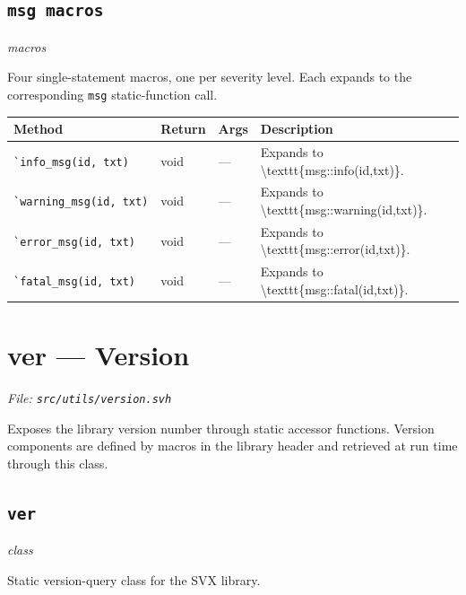 \documentclass[11pt,letterpaper]{report}
\begin{document}
\subsection*{\texttt{msg macros}}
\noindent\small\textit{macros}\par

Four single-statement macros, one per severity level. Each expands to the corresponding \texttt{msg} static-function call.

\begin{xltabular}{\linewidth}{>{\small}p{1.35in} >{\small}p{1.25in} >{\small}p{0.95in} >{\small}X}
\toprule
\textbf{Method} & \textbf{Return} & \textbf{Args} & \textbf{Description} \\
\midrule
\endhead
\bottomrule
\endfoot
\texttt{\`{}info\_msg(id,\ txt)} & void & --- & Expands to \textbackslash{}texttt\{msg::info(id,txt)\}. \\
\texttt{\`{}warning\_msg(id,\ txt)} & void & --- & Expands to \textbackslash{}texttt\{msg::warning(id,txt)\}. \\
\texttt{\`{}error\_msg(id,\ txt)} & void & --- & Expands to \textbackslash{}texttt\{msg::error(id,txt)\}. \\
\texttt{\`{}fatal\_msg(id,\ txt)} & void & --- & Expands to \textbackslash{}texttt\{msg::fatal(id,txt)\}. \\
\end{xltabular}

\section{ver --- Version}
\noindent\small\textit{File: \texttt{src/utils/version.svh}}\par

Exposes the library version number through static accessor functions. Version components are defined by macros in the library header and retrieved at run time through this class.

\subsection*{\texttt{ver}}
\noindent\small\textit{class}\par

Static version-query class for the SVX library.
\end{document}
